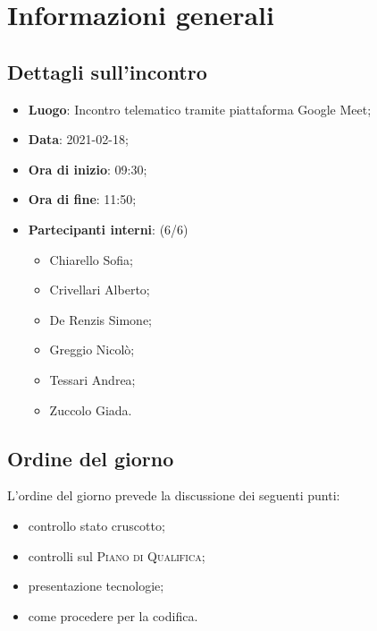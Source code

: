 \section{Informazioni generali}

\subsection{Dettagli sull'incontro}
\begin{itemize}
\item \textbf{Luogo}: Incontro telematico tramite piattaforma Google Meet;
\item \textbf{Data}: 2021-02-18;
\item \textbf{Ora di inizio}: 09:30;
\item \textbf{Ora di fine}: 11:50;
\item \textbf{Partecipanti interni}: (6/6)
\begin{itemize}
	\item Chiarello Sofia;
	\item Crivellari Alberto;
	\item De Renzis Simone;
	\item Greggio Nicolò;
	\item Tessari Andrea;
	\item Zuccolo Giada.
\end{itemize}
\end{itemize}

\subsection{Ordine del giorno}

L'ordine del giorno prevede la discussione dei seguenti punti:
\begin{itemize}
	\item controllo stato cruscotto;
	\item controlli sul \textsc{Piano di Qualifica};
    \item presentazione tecnologie;
    \item come procedere per la codifica.
\end{itemize}




